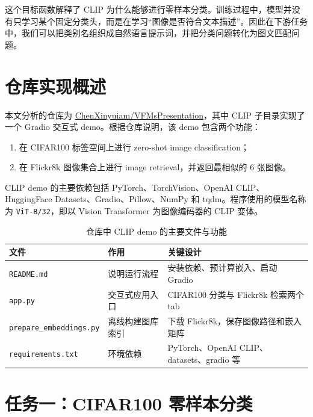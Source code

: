 \documentclass[UTF8,zihao=-4]{ctexart}
\begin{document}
这个目标函数解释了 CLIP 为什么能够进行零样本分类。训练过程中，模型并没有只学习某个固定分类头，而是在学习“图像是否符合文本描述”。因此在下游任务中，我们可以把类别名组织成自然语言提示词，并把分类问题转化为图文匹配问题。

\section{仓库实现概述}

本文分析的仓库为 \href{https://github.com/ChenXinyuiam/VFMsPresentation}{ChenXinyuiam/VFMsPresentation}，其中 CLIP 子目录实现了一个 Gradio 交互式 demo。根据仓库说明，该 demo 包含两个功能：
\begin{enumerate}[label=(\arabic*)]
  \item 在 CIFAR100 标签空间上进行 zero-shot image classification；
  \item 在 Flickr8k 图像集合上进行 image retrieval，并返回最相似的 6 张图像。
\end{enumerate}

CLIP demo 的主要依赖包括 PyTorch、TorchVision、OpenAI CLIP、HuggingFace Datasets、Gradio、Pillow、NumPy 和 tqdm。程序使用的模型名称为 \texttt{ViT-B/32}，即以 Vision Transformer 为图像编码器的 CLIP 变体。

\begin{table}[h]
  \centering
  \caption{仓库中 CLIP demo 的主要文件与功能}
  \begin{tabular}{>{\raggedright\arraybackslash}p{4.7cm}
                  >{\raggedright\arraybackslash}p{3.4cm}
                  >{\raggedright\arraybackslash}p{5.7cm}}
    \toprule
    文件 & 作用 & 关键设计 \\
    \midrule
    \texttt{README.md} & 说明运行流程 & 安装依赖、预计算嵌入、启动 Gradio \\
    \texttt{app.py} & 交互式应用入口 & CIFAR100 分类与 Flickr8k 检索两个 tab \\
    \texttt{prepare\_embeddings.py} & 离线构建图库索引 & 下载 Flickr8k，保存图像路径和嵌入矩阵 \\
    \texttt{requirements.txt} & 环境依赖 & PyTorch、OpenAI CLIP、datasets、gradio 等 \\
    \bottomrule
  \end{tabular}
\end{table}

\section{任务一：CIFAR100 零样本分类}
\end{document}
